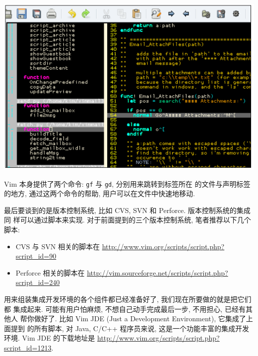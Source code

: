 \begin{center}
    \includegraphics[scale=0.6]{./images/page209.png}
\end{center}
Vim 本身提供了两个命令: \texttt{gf} 与 \texttt{gd}, 分别用来跳转到标签所在
的文件与声明标签的地方, 通过这两个命令的帮助, 用户可以在文件中快速地移动.

最后要谈到的是版本控制系统, 比如 CVS, SVN 和 Perforce. 版本控制系统的集成同
样可以通过脚本来实现. 对于前面提到的三个版本控制系统, 笔者推荐以下几个脚本:
\begin{itemize}
    \item CVS 与 SVN 相关的脚本在
        \url{http://www.vim.org/scripts/script.php?script_id=90}
    \item Perforce 相关的脚本在
        \url{http://vim.sourceforge.net/scripts/script.php?script_id=240}
\end{itemize}

用来组装集成开发环境的各个组件都已经准备好了, 我们现在所要做的就是把它们都
集成起来. 可能有用户怕麻烦, 不想自己动手完成最后一步, 不用担心, 已经有其他人
帮你做好了. 比如 Vim JDE (Just a Development Environment), 它集成了上面提到
的所有脚本, 对 Java, C/C++ 程序员来说, 这是一个功能丰富的集成开发环境. Vim JDE
的下载地址是 \url{http://www.vim.org/scripts/script.php?script_id=1213}.
